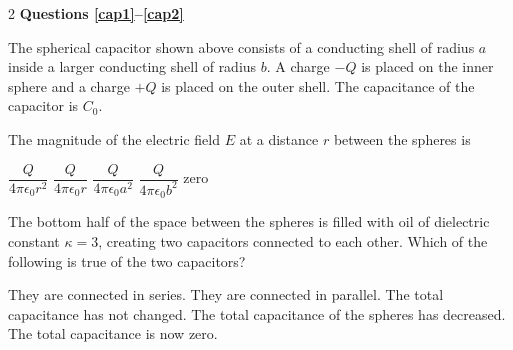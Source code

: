 \documentclass{../../../oss-apphys-exam}
\begin{document}

\raggedcolumns

\begin{multicols*}{2}
  \textbf{Questions \ref{cap1}--\ref{cap2}}

  \begin{center}
  \end{center}
  The spherical capacitor shown above consists of a conducting shell of
  radius $a$ inside a larger conducting shell of radius $b$. A charge $-Q$
  is placed on the inner sphere and a charge $+Q$ is placed on the outer
  shell. The capacitance of the capacitor is $C_0$.

  \begin{questions}
    \question The magnitude of the electric field $E$ at a distance $r$ between
    the spheres is
    \label{cap1}
    \begin{choices}
      \choice $\dfrac Q{4\pi\epsilon_0r^2}$
      \choice $\dfrac Q{4\pi\epsilon_0r}$
      \choice $\dfrac Q{4\pi\epsilon_0a^2}$
      \choice $\dfrac Q{4\pi\epsilon_0b^2}$
      \choice zero
    \end{choices}

    \question The bottom half of the space between the spheres is filled with
    oil of dielectric constant $\kappa=3$, creating two capacitors connected to
    each other. Which of the following is true of the two capacitors?
    \begin{center}
    \end{center}
    \begin{choices}
      \choice They are connected in series.
      \choice They are connected in parallel.
      \choice The total capacitance has not changed.
      \choice The total capacitance of the spheres has decreased.
      \choice The total capacitance is now zero.
    \end{choices}
    \vspace{.7in}
    \columnbreak
    

\end{questions}
\end{multicols*}
\end{document}
